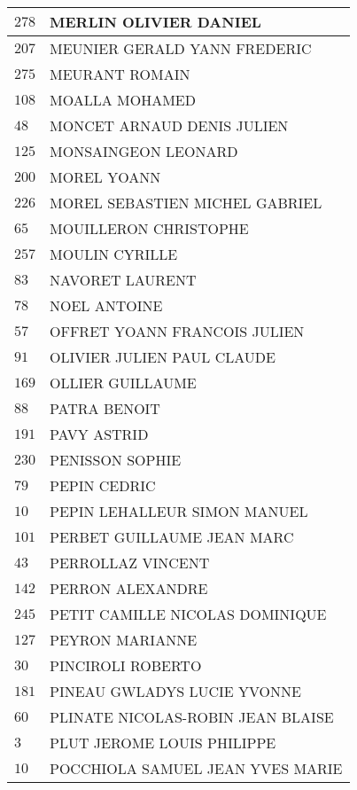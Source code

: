\begin{xltabular}{\linewidth}{|l|X|}
    \hline
    $278$ & MERLIN OLIVIER DANIEL \\
    \hline
    $207$ & MEUNIER GERALD YANN FREDERIC \\
    \hline
    $275$ & MEURANT ROMAIN \\
    \hline
    $108$ & MOALLA MOHAMED \\
    \hline
    $48$ & MONCET ARNAUD DENIS JULIEN \\
    \hline
    $125$ & MONSAINGEON LEONARD \\
    \hline
    $200$ & MOREL YOANN \\
    \hline
    $226$ & MOREL SEBASTIEN MICHEL GABRIEL \\
    \hline
    $65$ & MOUILLERON CHRISTOPHE \\
    \hline
    $257$ & MOULIN CYRILLE \\
    \hline
    $83$ & NAVORET LAURENT \\
    \hline
    $78$ & NOEL ANTOINE \\
    \hline
    $57$ & OFFRET YOANN FRANCOIS JULIEN \\
    \hline
    $91$ & OLIVIER JULIEN PAUL CLAUDE \\
    \hline
    $169$ & OLLIER GUILLAUME \\
    \hline
    $88$ & PATRA BENOIT \\
    \hline
    $191$ & PAVY ASTRID \\
    \hline
    $230$ & PENISSON SOPHIE \\
    \hline
    $79$ & PEPIN CEDRIC \\
    \hline
    $10$ & PEPIN LEHALLEUR SIMON MANUEL \\
    \hline
    $101$ & PERBET GUILLAUME JEAN MARC \\
    \hline
    $43$ & PERROLLAZ VINCENT \\
    \hline
    $142$ & PERRON ALEXANDRE \\
    \hline
    $245$ & PETIT CAMILLE NICOLAS DOMINIQUE \\
    \hline
    $127$ & PEYRON MARIANNE \\
    \hline
    $30$ & PINCIROLI ROBERTO \\
    \hline
    $181$ & PINEAU GWLADYS LUCIE YVONNE \\
    \hline
    $60$ & PLINATE NICOLAS-ROBIN JEAN BLAISE \\
    \hline
    $3$ & PLUT JEROME LOUIS PHILIPPE \\
    \hline
    $10$ & POCCHIOLA SAMUEL JEAN YVES MARIE \\

\end{xltabular}
